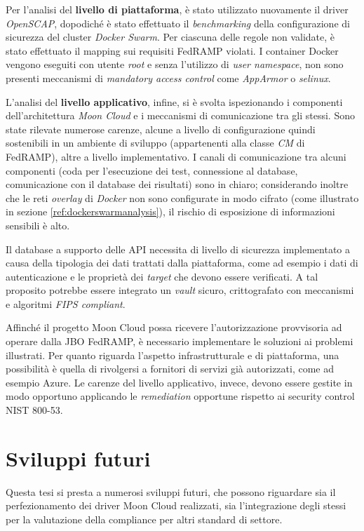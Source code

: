 \documentclass[../main.tex]{subfiles}
\begin{document}
Per l'analisi del \textbf{livello di piattaforma}, è stato utilizzato nuovamente il driver \textit{OpenSCAP}, dopodiché è stato effettuato il \textit{benchmarking} della configurazione di sicurezza del cluster \textit{Docker Swarm}. Per ciascuna delle regole non validate, è stato effettuato il mapping sui requisiti FedRAMP violati.
I container Docker vengono eseguiti con utente \textit{root} e senza l'utilizzo di \textit{user namespace}, non sono presenti meccanismi di \textit{mandatory access control} come \textit{AppArmor} o \textit{selinux}. 
 
L'analisi del \textbf{livello applicativo}, infine, si è svolta ispezionando i componenti dell'architettura \textit{Moon Cloud} e i meccanismi di comunicazione tra gli stessi. Sono state rilevate numerose carenze, alcune a livello di configurazione quindi sostenibili in un ambiente di sviluppo (appartenenti alla classe \textit{CM} di FedRAMP), altre a livello implementativo.
I canali di comunicazione tra alcuni componenti (coda per l'esecuzione dei test, connessione al database, comunicazione con il database dei risultati) sono in chiaro; considerando inoltre che le reti \textit{overlay} di \textit{Docker} non sono configurate in modo cifrato (come illustrato in sezione \ref{ref:dockerswarmanalysis}), il rischio di esposizione di informazioni sensibili è alto.

Il database a supporto delle API necessita di livello di sicurezza implementato a causa della tipologia dei dati trattati dalla piattaforma, come ad esempio i dati di autenticazione e le proprietà dei \textit{target} che devono essere verificati.
A tal proposito potrebbe essere integrato un \textit{vault} sicuro, crittografato con meccanismi e algoritmi \textit{FIPS compliant}.

Affinché il progetto Moon Cloud possa ricevere l'autorizzazione provvisoria ad operare dalla JBO FedRAMP, è necessario implementare le soluzioni ai problemi illustrati.
Per quanto riguarda l'aspetto infrastrutturale e di piattaforma, una possibilità è quella di rivolgersi a fornitori di servizi già autorizzati, come ad esempio Azure.
Le carenze del livello applicativo, invece, devono essere gestite in modo opportuno applicando le \textit{remediation} opportune rispetto ai security control NIST 800-53.

\section {Sviluppi futuri}
Questa tesi si presta a numerosi sviluppi futuri, che possono riguardare sia il perfezionamento dei driver Moon Cloud realizzati, sia l'integrazione degli stessi per la valutazione della compliance per altri standard di settore.
\end{document}
